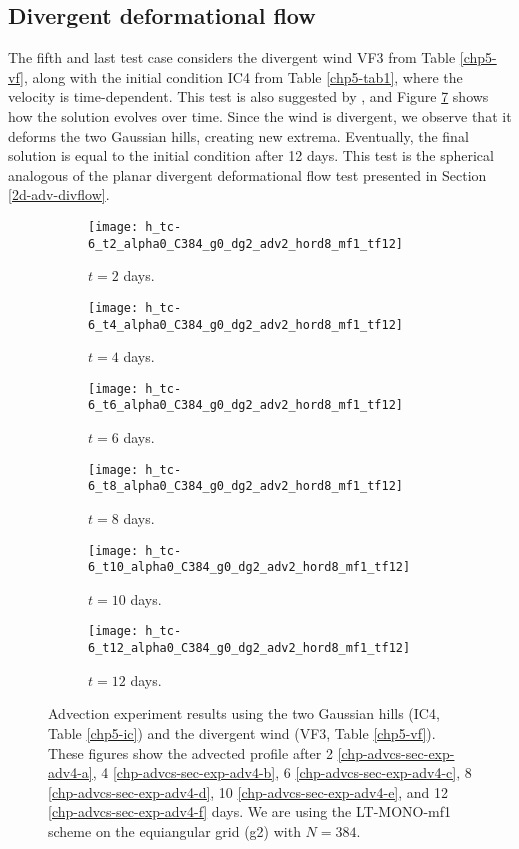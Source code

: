 \subsection{Divergent deformational flow}
The fifth and last test case considers the divergent wind VF3 from Table \ref{chp5-vf}, along with the initial condition IC4 from Table \ref{chp5-tab1}, 
where the velocity is time-dependent.
This test is also suggested by \citet{nair:2010}, and Figure \ref{chp-advcs-sec-exp-adv4} shows how the solution evolves over time.
Since the wind is divergent, we observe that it deforms the two Gaussian hills, creating new extrema.
Eventually, the final solution is equal to the initial condition after 12 days.
This test is the spherical analogous of the planar divergent deformational flow test presented in Section \ref{2d-adv-divflow}.
\begin{figure}[!htb]
	\centering
	\begin{subfigure}{0.45\textwidth}
		\centering
		\texttt{[image: h\_tc-6\_t2\_alpha0\_C384\_g0\_dg2\_adv2\_hord8\_mf1\_tf12]}
		\caption{$t=2$ days.\label{chp-advcs-sec-exp-adv4-a}}
	\end{subfigure}
	\begin{subfigure}{0.45\textwidth}
		\centering
		\texttt{[image: h\_tc-6\_t4\_alpha0\_C384\_g0\_dg2\_adv2\_hord8\_mf1\_tf12]}
		\caption{$t=4$ days.\label{chp-advcs-sec-exp-adv4-b}}
	\end{subfigure}

	\begin{subfigure}{0.45\textwidth}
		\centering
		\texttt{[image: h\_tc-6\_t6\_alpha0\_C384\_g0\_dg2\_adv2\_hord8\_mf1\_tf12]}
		\caption{$t=6$ days.\label{chp-advcs-sec-exp-adv4-c}}
	\end{subfigure}
	\begin{subfigure}{0.45\textwidth}
		\centering
		\texttt{[image: h\_tc-6\_t8\_alpha0\_C384\_g0\_dg2\_adv2\_hord8\_mf1\_tf12]}
		\caption{$t=8$ days.\label{chp-advcs-sec-exp-adv4-d}}
	\end{subfigure}

	\begin{subfigure}{0.45\textwidth}
		\centering
		\texttt{[image: h\_tc-6\_t10\_alpha0\_C384\_g0\_dg2\_adv2\_hord8\_mf1\_tf12]}
		\caption{$t=10$ days.\label{chp-advcs-sec-exp-adv4-e}}
	\end{subfigure}
	\begin{subfigure}{0.45\textwidth}
		\centering
		\texttt{[image: h\_tc-6\_t12\_alpha0\_C384\_g0\_dg2\_adv2\_hord8\_mf1\_tf12]}
		\caption{$t=12$ days.\label{chp-advcs-sec-exp-adv4-f}}
	\end{subfigure}
	\caption{
Advection experiment results using the two Gaussian hills  (IC4, Table \ref{chp5-ic}) and 
the divergent wind (VF3, Table \ref{chp5-vf}).
These figures show the advected profile after
2 \eqref{chp-advcs-sec-exp-adv4-a}, 
4  \eqref{chp-advcs-sec-exp-adv4-b},
6  \eqref{chp-advcs-sec-exp-adv4-c},
8  \eqref{chp-advcs-sec-exp-adv4-d},
10  \eqref{chp-advcs-sec-exp-adv4-e},
and 12  \eqref{chp-advcs-sec-exp-adv4-f} days.
We are using the LT-MONO-mf1 scheme on the equiangular grid (g2) with $N=384$. \label{chp-advcs-sec-exp-adv4}}
\end{figure}

